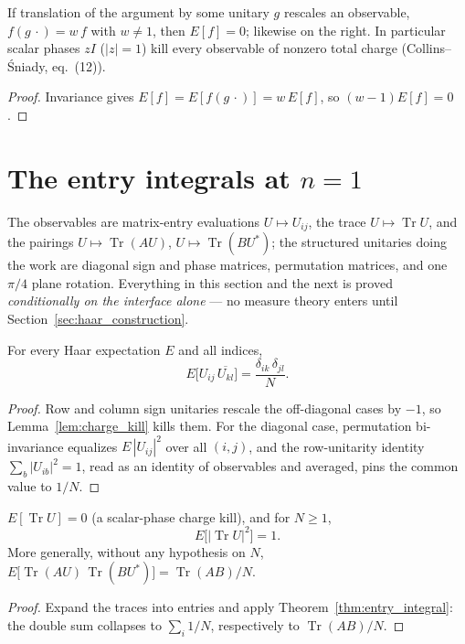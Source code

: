 \begin{lemma}\label{lem:charge_kill}
\leanok
{}
If translation of the argument by some unitary $g$ rescales an
observable, $f(g\,\cdot)=w\,f$ with $w\neq1$, then $E[f]=0$; likewise
on the right. In particular scalar phases $zI$ ($|z|=1$) kill every
observable of nonzero total charge (Collins--\'Sniady, eq.~(12)).
\end{lemma}
\begin{proof}
\leanok
{}
Invariance gives $E[f]=E[f(g\,\cdot)]=w\,E[f]$, so
$(w-1)E[f]=0$.
\end{proof}

\section{The entry integrals at \texorpdfstring{$n=1$}{n=1}}

The observables are matrix-entry evaluations
$U\mapsto U_{ij}$, the trace $U\mapsto\operatorname{Tr}U$, and the
pairings $U\mapsto\operatorname{Tr}(AU)$,
$U\mapsto\operatorname{Tr}(BU^{*})$; the structured unitaries doing
the work are diagonal sign and phase matrices, permutation matrices,
and one $\pi/4$ plane rotation. Everything in this section and the
next is proved \emph{conditionally on the interface alone} --- no
measure theory enters until Section~\ref{sec:haar_construction}.

\begin{theorem}[The $n=1$ entry table]\label{thm:entry_integral}
\leanok
{}
For every Haar expectation $E$ and all indices,
\[
E\bigl[U_{ij}\,\overline{U_{kl}}\bigr]
=\frac{\delta_{ik}\,\delta_{jl}}{N}.
\]
\end{theorem}
\begin{proof}
\leanok
{}
Row and column sign unitaries rescale the off-diagonal cases by $-1$,
so Lemma~\ref{lem:charge_kill} kills them. For the diagonal case,
permutation bi-invariance equalizes $E\,|U_{ij}|^{2}$ over all
$(i,j)$, and the row-unitarity identity
$\sum_{b}|U_{ib}|^{2}=1$, read as an identity of observables and
averaged, pins the common value to $1/N$.
\end{proof}

\begin{theorem}[Trace moments at $n=1$]\label{thm:trace_moments_one}
\leanok
{}
$E[\operatorname{Tr}U]=0$ (a scalar-phase charge kill), and for
$N\geq1$,
\[
E\bigl[|\operatorname{Tr}U|^{2}\bigr]=1 .
\]
More generally, without any hypothesis on $N$,
$E\bigl[\operatorname{Tr}(AU)\,\operatorname{Tr}(BU^{*})\bigr]
=\operatorname{Tr}(AB)/N$.
\end{theorem}
\begin{proof}
\leanok
{}
Expand the traces into entries and apply
Theorem~\ref{thm:entry_integral}: the double sum collapses to
$\sum_{i}1/N$, respectively to $\operatorname{Tr}(AB)/N$.
\end{proof}

